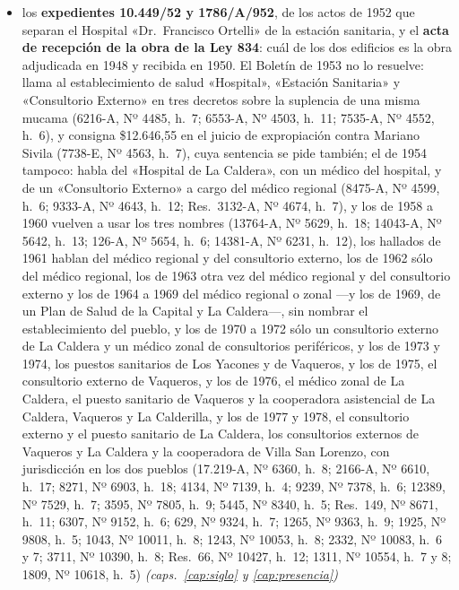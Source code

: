 \begin{itemize}[leftmargin=*]
\item los \textbf{expedientes 10.449/52 y 1786/A/952}, de los actos de 1952 que separan el Hospital «Dr.\ Francisco Ortelli» de la estación sanitaria, y el \textbf{acta de recepción de la obra de la Ley 834}: cuál de los dos edificios es la obra adjudicada en 1948 y recibida en 1950. El Boletín de 1953 no lo resuelve: llama al establecimiento de salud «Hospital», «Estación Sanitaria» y «Consultorio Externo» en tres decretos sobre la suplencia de una misma mucama (6216-A, Nº 4485, h.\ 7; 6553-A, Nº 4503, h.\ 11; 7535-A, Nº 4552, h.\ 6), y consigna \$12.646,55 en el juicio de expropiación contra Mariano Sivila (7738-E, Nº 4563, h.\ 7), cuya sentencia se pide también; el de 1954 tampoco: habla del «Hospital de La Caldera», con un médico del hospital, y de un «Consultorio Externo» a cargo del médico regional (8475-A, Nº 4599, h.\ 6; 9333-A, Nº 4643, h.\ 12; Res.\ 3132-A, Nº 4674, h.\ 7), y los de 1958 a 1960 vuelven a usar los tres nombres (13764-A, Nº 5629, h.\ 18; 14043-A, Nº 5642, h.\ 13; 126-A, Nº 5654, h.\ 6; 14381-A, Nº 6231, h.\ 12), los hallados de 1961 hablan del médico regional y del consultorio externo, los de 1962 sólo del médico regional, los de 1963 otra vez del médico regional y del consultorio externo y los de 1964 a 1969 del médico regional o zonal ---y los de 1969, de un Plan de Salud de la Capital y La Caldera---, sin nombrar el establecimiento del pueblo, y los de 1970 a 1972 sólo un consultorio externo de La Caldera y un médico zonal de consultorios periféricos, y los de 1973 y 1974, los puestos sanitarios de Los Yacones y de Vaqueros, y los de 1975, el consultorio externo de Vaqueros, y los de 1976, el médico zonal de La Caldera, el puesto sanitario de Vaqueros y la cooperadora asistencial de La Caldera, Vaqueros y La Calderilla, y los de 1977 y 1978, el consultorio externo y el puesto sanitario de La Caldera, los consultorios externos de Vaqueros y La Caldera y la cooperadora de Villa San Lorenzo, con jurisdicción en los dos pueblos (17.219-A, Nº 6360, h.\ 8; 2166-A, Nº 6610, h.\ 17; 8271, Nº 6903, h.\ 18; 4134, Nº 7139, h.\ 4; 9239, Nº 7378, h.\ 6; 12389, Nº 7529, h.\ 7; 3595, Nº 7805, h.\ 9; 5445, Nº 8340, h.\ 5; Res.\ 149, Nº 8671, h.\ 11; 6307, Nº 9152, h.\ 6; 629, Nº 9324, h.\ 7; 1265, Nº 9363, h.\ 9; 1925, Nº 9808, h.\ 5; 1043, Nº 10011, h.\ 8; 1243, Nº 10053, h.\ 8; 2332, Nº 10083, h.\ 6 y 7; 3711, Nº 10390, h.\ 8; Res.\ 66, Nº 10427, h.\ 12; 1311, Nº 10554, h.\ 7 y 8; 1809, Nº 10618, h.\ 5) \textit{(caps.\ \ref{cap:siglo} y \ref{cap:presencia})}

\end{itemize}
